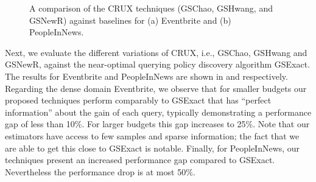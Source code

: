 \begin{figure}[h]
\begin{center}
\end{center}
\vspace{-5pt}
\caption{A comparison of the CRUX techniques (GSChao, GSHwang, and GSNewR) against baselines for (a) Eventbrite and (b) PeopleInNews.}
\label{fig:resultsextr}
\vspace{-10pt}
\end{figure}

\vspace{3pt}
Next, we evaluate the different variations of CRUX, i.e., GSChao, GSHwang and GSNewR, against the near-optimal querying policy discovery algorithm GSExact. The results for Eventbrite and PeopleInNews are shown in  and  respectively. Regarding the dense domain Eventbrite, we observe that for smaller budgets our proposed techniques perform comparably to GSExact that has ``perfect information'' about the gain of each query, typically demonstrating a performance gap of less than 10\%. For larger budgets this gap increases to 25\%. Note that our estimators have access to few samples and sparse information; the fact that we are able to get this close to GSExact is notable. Finally, for PeopleInNews, our techniques present an increased performance gap compared to GSExact. Nevertheless the performance drop is at most 50\%. 

